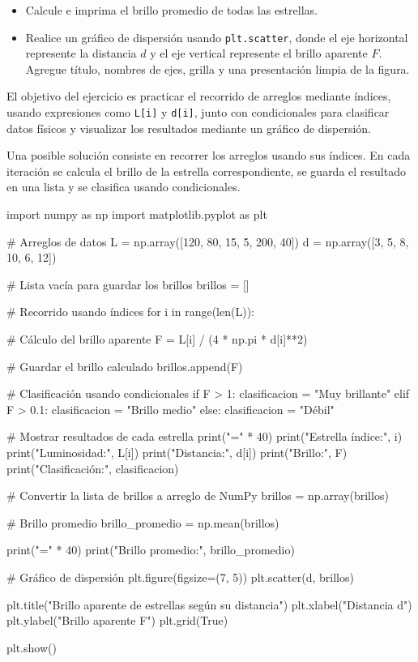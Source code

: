\begin{tcolorbox}[colback=blue!2!white,colframe=blue!55!black,title={Enunciado},breakable]
\begin{itemize}
    \item[(f)] Calcule e imprima el brillo promedio de todas las estrellas.

    \item[(g)] Realice un gráfico de dispersión usando \texttt{plt.scatter}, donde el eje horizontal represente la distancia $d$ y el eje vertical represente el brillo aparente $F$. Agregue título, nombres de ejes, grilla y una presentación limpia de la figura.
\end{itemize}

El objetivo del ejercicio es practicar el recorrido de arreglos mediante índices, usando expresiones como \texttt{L[i]} y \texttt{d[i]}, junto con condicionales para clasificar datos físicos y visualizar los resultados mediante un gráfico de dispersión.
\end{tcolorbox}

\begin{solution}
Una posible solución consiste en recorrer los arreglos usando sus índices. En cada iteración se calcula el brillo de la estrella correspondiente, se guarda el resultado en una lista y se clasifica usando condicionales.

\begin{pythonjupyter}
import numpy as np
import matplotlib.pyplot as plt

# Arreglos de datos
L = np.array([120, 80, 15, 5, 200, 40])
d = np.array([3, 5, 8, 10, 6, 12])

# Lista vacía para guardar los brillos
brillos = []

# Recorrido usando índices
for i in range(len(L)):

    # Cálculo del brillo aparente
    F = L[i] / (4 * np.pi * d[i]**2)

    # Guardar el brillo calculado
    brillos.append(F)

    # Clasificación usando condicionales
    if F > 1:
        clasificacion = "Muy brillante"
    elif F > 0.1:
        clasificacion = "Brillo medio"
    else:
        clasificacion = "Débil"

    # Mostrar resultados de cada estrella
    print("=" * 40)
    print("Estrella índice:", i)
    print("Luminosidad:", L[i])
    print("Distancia:", d[i])
    print("Brillo:", F)
    print("Clasificación:", clasificacion)

# Convertir la lista de brillos a arreglo de NumPy
brillos = np.array(brillos)

# Brillo promedio
brillo_promedio = np.mean(brillos)

print("=" * 40)
print("Brillo promedio:", brillo_promedio)

# Gráfico de dispersión
plt.figure(figsize=(7, 5))
plt.scatter(d, brillos)

plt.title("Brillo aparente de estrellas según su distancia")
plt.xlabel("Distancia d")
plt.ylabel("Brillo aparente F")
plt.grid(True)

plt.show()
\end{pythonjupyter}
\end{solution}
